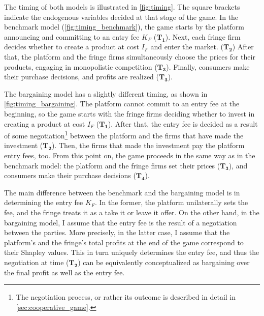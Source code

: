 \documentclass[a4paper]{article}
\begin{document}
The timing of both models is illustrated in \cref{fig:timing}.
The square brackets indicate the endogenous variables decided at that stage of the game.
In the benchmark model (\cref{fig:timing_benchmark}), the game starts by the platform announcing and committing to an entry fee $K_F$ ($\mathbf{T_1}$).
Next, each fringe firm decides whether to create a product at cost $I_F$ and enter the market. ($\mathbf{T_2}$)
After that, the platform and the fringe firms simultaneously choose the prices for their products, engaging in monopolistic competition ($\mathbf{T_3}$).
Finally, consumers make their purchase decisions, and profits are realized ($\mathbf{T_3}$).

The bargaining model has a slightly different timing, as shown in \cref{fig:timing_bargaining}.
The platform cannot commit to an entry fee at the beginning, so the game starts with the fringe firms deciding whether to invest in creating a product at cost $I_F$ ($\mathbf{T_1}$).
After that, the entry fee is decided as a result of some negotiation\footnote{
    The negotiation process, or rather its outcome is described in detail in \cref{sec:cooperative_game}.
} between the platform and the firms that have made the investment ($\mathbf{T_2}$).
Then, the firms that made the investment pay the platform entry fees, too.
From this point on, the game proceeds in the same way as in the benchmark model: the platform and the fringe firms set their prices ($\mathbf{T_3}$), and consumers make their purchase decisions ($\mathbf{T_4}$). 

The main difference between the benchmark and the bargaining model is in determining the entry fee $K_F$.
In the former, the platform unilaterally sets the fee, and the fringe treats it as a take it or leave it offer.
On the other hand, in the bargaining model, I assume that the entry fee is the result of a negotiation between the parties.
More precisely, in the latter case, I assume that the platform's and the fringe's total profits at the end of the game correspond to their Shapley values.
This in turn uniquely determines the entry fee, and thus the negotiation at time ($\mathbf{T_2}$) can be equivalently conceptualized as bargaining over the final profit as well as the entry fee.
\end{document}
